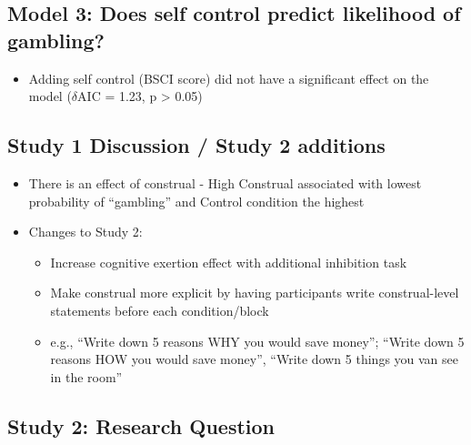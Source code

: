 \documentclass[
  letterpaper,
  DIV=11,
  numbers=noendperiod]{scrartcl}
\providecommand{\tightlist}{%
  \setlength{\itemsep}{0pt}\setlength{\parskip}{0pt}}\usepackage{longtable,booktabs,array}
\begin{document}
\hypertarget{model-3-does-self-control-predict-likelihood-of-gambling}{%
\subsection{Model 3: Does self control predict likelihood of
gambling?}\label{model-3-does-self-control-predict-likelihood-of-gambling}}

\begin{itemize}
\tightlist
\item
  Adding self control (BSCI score) did not have a significant effect on
  the model (\(\delta\)AIC = 1.23, p \textgreater{} 0.05)
\end{itemize}

\hypertarget{study-1-discussion-study-2-additions}{%
\subsection{Study 1 Discussion / Study 2
additions}\label{study-1-discussion-study-2-additions}}

\begin{itemize}
\item
  There is an effect of construal - High Construal associated with
  lowest probability of ``gambling'' and Control condition the highest
\item
  Changes to Study 2:

  \begin{itemize}
  \tightlist
  \item
    Increase cognitive exertion effect with additional inhibition task
  \item
    Make construal more explicit by having participants write
    construal-level statements before each condition/block
  \end{itemize}

  \begin{itemize}
  \tightlist
  \item
    e.g., ``Write down 5 reasons WHY you would save money''; ``Write
    down 5 reasons HOW you would save money'', ``Write down 5 things you
    van see in the room''
  \end{itemize}
\end{itemize}

\hypertarget{study-2-research-question}{%
\subsection{Study 2: Research
Question}\label{study-2-research-question}}
\end{document}
